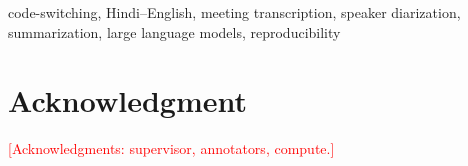 \documentclass[conference]{IEEEtran}
\newif\iffinal
\newcommand{\pending}[1]{%
  \iffinal\errmessage{Unfinished placeholder: #1}\else\textcolor{red}{[#1]}\fi}
\begin{document}
\begin{IEEEkeywords}
code-switching, Hindi--English, meeting transcription, speaker diarization,
summarization, large language models, reproducibility
\end{IEEEkeywords}









\section*{Acknowledgment}
\pending{Acknowledgments: supervisor, annotators, compute.}



\end{document}
